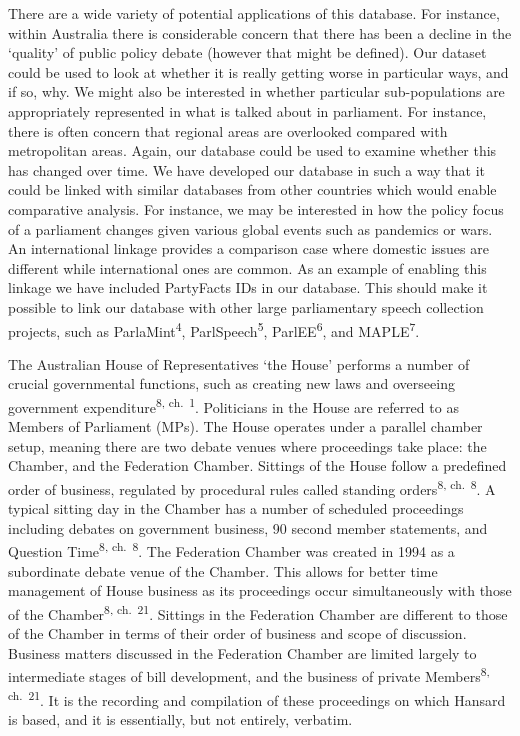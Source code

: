 \documentclass[
  letterpaper,
  DIV=11,
  numbers=noendperiod]{scrartcl}
\begin{document}
There are a wide variety of potential applications of this database. For
instance, within Australia there is considerable concern that there has
been a decline in the `quality' of public policy debate (however that
might be defined). Our dataset could be used to look at whether it is
really getting worse in particular ways, and if so, why. We might also
be interested in whether particular sub-populations are appropriately
represented in what is talked about in parliament. For instance, there
is often concern that regional areas are overlooked compared with
metropolitan areas. Again, our database could be used to examine whether
this has changed over time. We have developed our database in such a way
that it could be linked with similar databases from other countries
which would enable comparative analysis. For instance, we may be
interested in how the policy focus of a parliament changes given various
global events such as pandemics or wars. An international linkage
provides a comparison case where domestic issues are different while
international ones are common. As an example of enabling this linkage we
have included PartyFacts IDs in our database. This should make it
possible to link our database with other large parliamentary speech
collection projects, such as ParlaMint\textsuperscript{4},
ParlSpeech\textsuperscript{5}, ParlEE\textsuperscript{6}, and
MAPLE\textsuperscript{7}.

The Australian House of Representatives `the House' performs a number of
crucial governmental functions, such as creating new laws and overseeing
government expenditure\textsuperscript{8, ch.~1}. Politicians in the
House are referred to as Members of Parliament (MPs). The House operates
under a parallel chamber setup, meaning there are two debate venues
where proceedings take place: the Chamber, and the Federation Chamber.
Sittings of the House follow a predefined order of business, regulated
by procedural rules called standing orders\textsuperscript{8, ch.~8}. A
typical sitting day in the Chamber has a number of scheduled proceedings
including debates on government business, 90 second member statements,
and Question Time\textsuperscript{8, ch.~8}. The Federation Chamber was
created in 1994 as a subordinate debate venue of the Chamber. This
allows for better time management of House business as its proceedings
occur simultaneously with those of the Chamber\textsuperscript{8,
ch.~21}. Sittings in the Federation Chamber are different to those of
the Chamber in terms of their order of business and scope of discussion.
Business matters discussed in the Federation Chamber are limited largely
to intermediate stages of bill development, and the business of private
Members\textsuperscript{8, ch.~21}. It is the recording and compilation
of these proceedings on which Hansard is based, and it is essentially,
but not entirely, verbatim.
\end{document}
